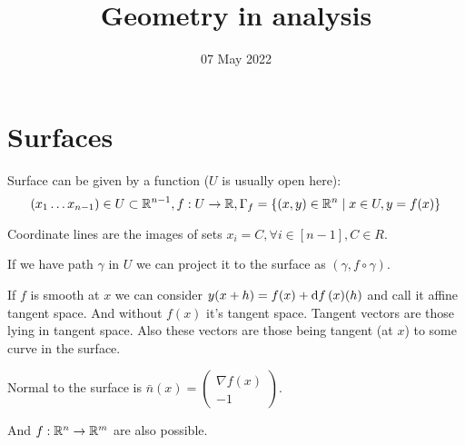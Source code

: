 
\title{Geometry in analysis}
\author{}
\date{07 May 2022}

\maketitle

\section*{Surfaces}

Surface can be given by a function ($U$ is usually open here):
\[ (x_1 \dots x_{n-1}) \in U \subset \mathbb R^{n-1}, f: U \to \mathbb R, 
\Gamma_f = \{ (x, y) \in \mathbb R^n \mid x \in U, y = f(x) \} \]

Coordinate lines are the images of sets $x_i = C, \forall i \in [n-1], C \in R$.

If we have path $\gamma$ in $U$ we can project it to the surface as $(\gamma, f \circ \gamma)$.

If $f$ is smooth at $x$ we can consider $y(x + h) = f(x) + \dd{f}\/(x)(h)$ and call it 
affine tangent space. And without $f(x)$ it's tangent space. Tangent vectors are those lying
in tangent space. Also these vectors are those being tangent (at $x$) to some curve in 
the surface.

Normal to the surface is $\bar n(x) = \begin{pmatrix}\nabla f(x)\\ -1\end{pmatrix}$.

And $f: \mathbb R^n \to \mathbb R^m$ are also possible.

